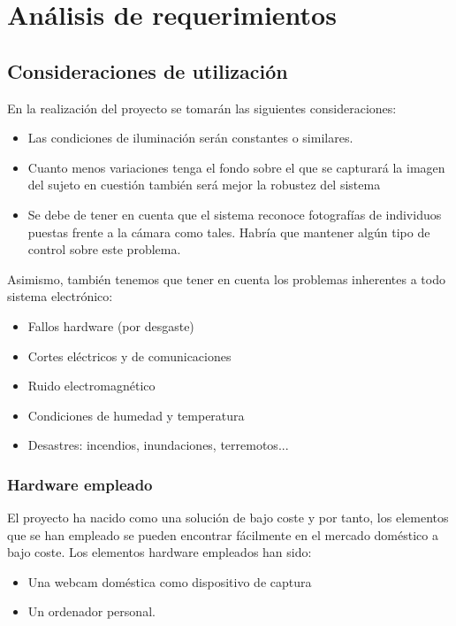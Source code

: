 \chapter{Análisis de requerimientos}

\section{Consideraciones de utilización}
En la realización del proyecto se tomarán las siguientes consideraciones:
\begin{itemize}
	\item{Las condiciones de iluminación serán constantes o similares.}
	\item{Cuanto menos variaciones tenga el fondo sobre el que se capturará la imagen del sujeto en cuestión también será mejor la robustez del sistema}
	\item{Se debe de tener en cuenta que el sistema reconoce fotografías de individuos puestas frente a la cámara como tales. Habría que mantener algún tipo de control sobre este problema.}
\end{itemize}
	
Asimismo, también tenemos que tener en cuenta los problemas inherentes a todo sistema electrónico:
\begin{itemize}
	\item{Fallos hardware (por desgaste)}
	\item{Cortes eléctricos y de comunicaciones}
	\item{Ruido electromagnético}
	\item{Condiciones de humedad y temperatura}
	\item{Desastres: incendios, inundaciones, terremotos...}
\end{itemize}

\subsection{Hardware empleado}
El proyecto ha nacido como una solución de bajo coste y por tanto, los elementos que se han empleado se pueden encontrar fácilmente en el mercado doméstico a bajo coste. Los elementos hardware empleados han sido:
\begin{itemize}
	\item{Una webcam doméstica como dispositivo de captura}
	\item{Un ordenador personal.}
\end{itemize}

